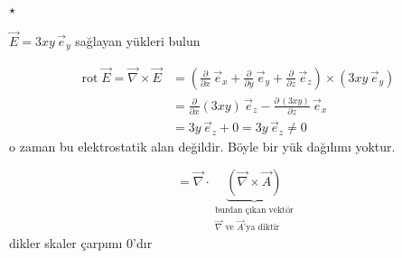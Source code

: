 \documentclass[11pt,a4paper]{article}
\begin{document}
\noindent $\star$

\begin{ornek}
$\vec E = 3xy\,\vec e_y$ \quad sağlayan yükleri bulun
\end{ornek}

\begin{align*}
\operatorname{rot}\vec E = \vec\nabla\times\vec E &= \left(\frac{\partial}{\partial x}\,\vec e_x + \frac{\partial}{\partial y}\,\vec e_y + \frac{\partial}{\partial z}\,\vec e_z\right)\times(3xy\,\vec e_y)\\
&= \frac{\partial}{\partial x}(3xy)\,\vec e_z - \frac{\partial\,(3xy)}{\partial z}\,\vec e_x\\
&= 3y\,\vec e_z + 0 = 3y\,\vec e_z \neq 0
\end{align*}
\noindent o zaman bu elektrostatik alan değildir. Böyle bir yük dağılımı yoktur.

\[ = \vec\nabla\cdot\underbrace{(\vec\nabla\times\vec A)}_{\substack{\text{burdan çıkan vektör}\\ \vec\nabla\text{ ve }\vec A\text{'ya diktir}}} \]
\noindent dikler skaler çarpımı 0'dır

\end{document}
